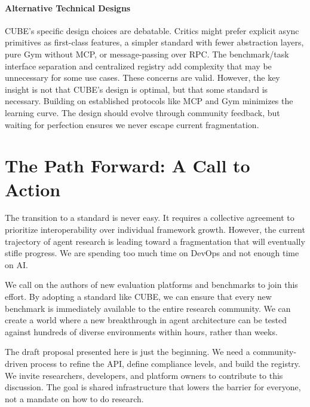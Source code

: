 \documentclass{article}
\theoremstyle{plain}
\theoremstyle{definition}
\theoremstyle{remark}
\begin{document}
\paragraph{Alternative Technical Designs}
CUBE's specific design choices are debatable. Critics might prefer explicit async primitives as first-class features, a simpler standard with fewer abstraction layers, pure Gym without MCP, or message-passing over RPC. The benchmark/task interface separation and centralized registry add complexity that may be unnecessary for some use cases. These concerns are valid. However, the key insight is not that CUBE's design is optimal, but that some standard is necessary. Building on established protocols like MCP and Gym minimizes the learning curve. The design should evolve through community feedback, but waiting for perfection ensures we never escape current fragmentation.

\section{The Path Forward: A Call to Action}

The transition to a standard is never easy. It requires a collective agreement to prioritize interoperability over individual framework growth. However, the current trajectory of agent research is leading toward a fragmentation that will eventually stifle progress. We are spending too much time on DevOps and not enough time on AI.

We call on the authors of new evaluation platforms and benchmarks to join this effort. By adopting a standard like CUBE, we can ensure that every new benchmark is immediately available to the entire research community. We can create a world where a new breakthrough in agent architecture can be tested against hundreds of diverse environments within hours, rather than weeks.

The draft proposal presented here is just the beginning. We need a community-driven process to refine the API, define compliance levels, and build the registry. We invite researchers, developers, and platform owners to contribute to this discussion. The goal is shared infrastructure that lowers the barrier for everyone, not a mandate on how to do research.



\end{document}
